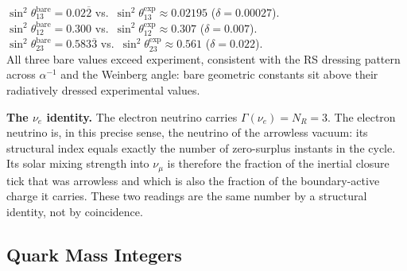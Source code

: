 \documentclass[11pt, letterpaper]{article}
\newcommand{\Tcharge}{\Gamma}
\theoremstyle{definition}
\theoremstyle{plain}
\begin{document}
\begin{verifybox}
$\sin^2\theta_{13}^{\mathrm{bare}}=0.02\overline{2}$ vs.\
$\sin^2\theta_{13}^{\mathrm{exp}}\approx 0.02195$ ($\delta=0.00027$).\\
$\sin^2\theta_{12}^{\mathrm{bare}}=0.300$ vs.\
$\sin^2\theta_{12}^{\mathrm{exp}}\approx 0.307$ ($\delta=0.007$).\\
$\sin^2\theta_{23}^{\mathrm{bare}}=0.583\overline{3}$ vs.\
$\sin^2\theta_{23}^{\mathrm{exp}}\approx 0.561$ ($\delta=0.022$).\\
All three bare values exceed experiment, consistent with the RS dressing
pattern across $\alpha^{-1}$ and the Weinberg angle: bare geometric
constants sit above their radiatively dressed experimental values.
\end{verifybox}

\begin{observebox}
\textbf{The $\nu_e$ identity.}
The electron neutrino carries $\Tcharge(\nu_e)=N_R=3$.  The electron
neutrino is, in this precise sense, the neutrino of the arrowless vacuum:
its structural index equals exactly the number of zero-surplus instants in
the cycle.  Its solar mixing strength into $\nu_\mu$ is therefore the
fraction of the inertial closure tick that was arrowless and which is also
the fraction of the boundary-active charge it carries.  These two readings
are the same number by a structural identity, not by coincidence.
\end{observebox}

\subsection{Quark Mass Integers}
\end{document}
